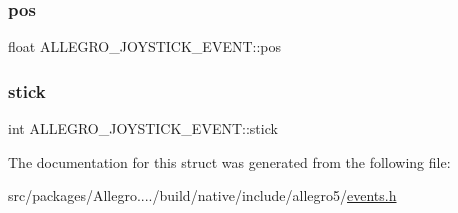\subsubsection{\texorpdfstring{pos}{pos}}
{\footnotesize\ttfamily float A\+L\+L\+E\+G\+R\+O\+\_\+\+J\+O\+Y\+S\+T\+I\+C\+K\+\_\+\+E\+V\+E\+N\+T\+::pos}

\mbox{\label{struct_a_l_l_e_g_r_o___j_o_y_s_t_i_c_k___e_v_e_n_t_a47182d42be549a78223d467d587a2e94}} 
\subsubsection{\texorpdfstring{stick}{stick}}
{\footnotesize\ttfamily int A\+L\+L\+E\+G\+R\+O\+\_\+\+J\+O\+Y\+S\+T\+I\+C\+K\+\_\+\+E\+V\+E\+N\+T\+::stick}



The documentation for this struct was generated from the following file\+:\begin{DoxyCompactItemize}
\item 
src/packages/\+Allegro..../build/native/include/allegro5/\hyperlink{events_8h}{events.\+h}\end{DoxyCompactItemize}
